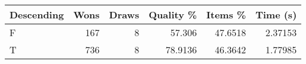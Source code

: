 \begin{tabular}{lrrrrr}
    \hline
    Descending & Wons & Draws & Quality \% & Items \% & Time (s) \\
    \hline
    F          & 167  & 8     & 57.306     & 47.6518  & 2.37153  \\
    T          & 736  & 8     & 78.9136    & 46.3642  & 1.77985  \\
    \hline
\end{tabular}